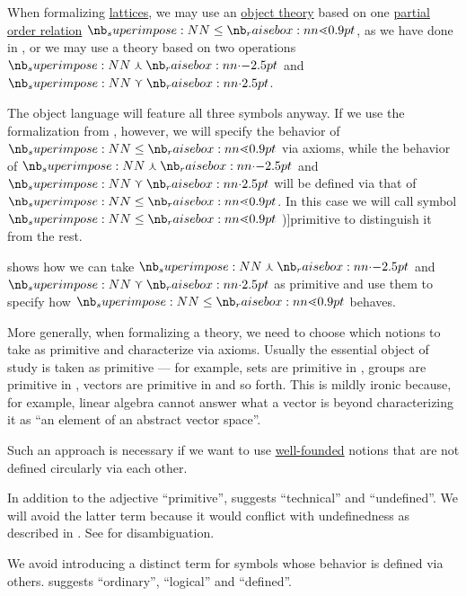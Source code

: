 \begin{concept}\label{con:primitive_notion}
  When formalizing \hyperref[def:lattice]{lattices}, we may use an \hyperref[con:metalogic]{object theory} based on one \hyperref[def:partially_ordered_set]{partial order relation} \( {\synleq} \), as we have done in , or we may use a theory based on two operations \( {\synvarwedge} \) and \( {\synvarvee} \).

  The object language will feature all three symbols anyway. If we use the formalization from , however, we will specify the behavior of \( {\synleq} \) via axioms, while the behavior of \( {\synvarwedge} \) and \( {\synvarvee} \) will be defined via that of \( {\synleq} \). In this case we will call symbol \( {\synleq} \) \term[en=primitive (\cite[28]{Kleene1971Metamathematics})]{primitive} to distinguish it from the rest.

   shows how we can take \( {\synvarwedge} \) and \( {\synvarvee} \) as primitive and use them to specify how \( {\synleq} \) behaves.

  More generally, when formalizing a theory, we need to choose which notions to take as primitive and characterize via axioms. Usually the essential object of study is taken as primitive --- for example, sets are primitive in , groups are primitive in , vectors are primitive in  and so forth. This is mildly ironic because, for example, linear algebra cannot answer what a vector is beyond characterizing it as \enquote{an element of an abstract vector space}.

  Such an approach is necessary if we want to use \hyperref[def:well_founded_relation]{well-founded} notions that are not defined circularly via each other.
\end{concept}
\begin{comments}
  \item In addition to the adjective \enquote{primitive},  suggests \enquote{technical} and \enquote{undefined}. We will avoid the latter term because it would conflict with undefinedness as described in . See  for disambiguation.

  \item We avoid introducing a distinct term for symbols whose behavior is defined via others.  suggests \enquote{ordinary}, \enquote{logical} and \enquote{defined}.
\end{comments}

